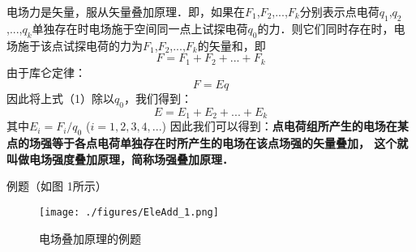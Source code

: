 
电场力是矢量，服从矢量叠加原理．即，如果在$F_1$,$F_2$,...,$F_k$分别表示点电荷$q_1$,$q_2$,...,$q_k$单独存在时电场施于空间同一点上试探电荷$q_0$的力．则它们同时存在时，电场施于该点试探电荷的力为$F_1$,$F_2$,...,$F_k$的矢量和，即
\begin{equation}
F = F_1 +F_2 +...+F_k
\end{equation}
由于库仑定律：
\begin{equation}
  F = Eq
\end{equation}
因此将上式（1）除以$q_0$，我们得到： 
\begin{equation}
E = E_1 + E_2 + ... +E_k
\end{equation}
其中$E_i = F_i/q_0$      ($i=1, 2, 3, 4, ...$)
因此我们可以得到：\textbf{点电荷组所产生的电场在某点的场强等于各点电荷单独存在时所产生的电场在该点场强的矢量叠加， 这个就叫做电场强度叠加原理，简称场强叠加原理．}


例题（如图 1所示）
\begin{figure}[ht]
\centering
\texttt{[image: ./figures/EleAdd\_1.png]}
\caption{电场叠加原理的例题} \label{EleAdd_fig1}
\end{figure}
